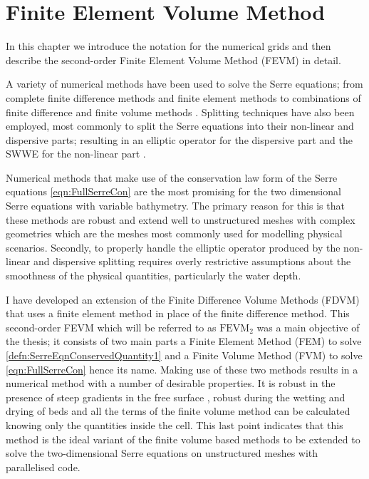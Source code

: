 \chapter{Finite Element Volume Method}
\label{chp:HFVMMethod}
In this chapter we introduce the notation for the numerical grids and then describe the second-order Finite Element Volume Method (FEVM) in detail.

A variety of numerical methods have been used to solve the Serre equations; from complete finite difference methods \cite{Cienfuegos-etal-2006-1217,El-etal-2006} and finite element methods \cite{Mitsotakis-etal-2014,Li-2014-169,Mitsotakis-etal-2017} to combinations of finite difference and finite volume methods \cite{Hank-etal-2010-2034,Zoppou-etal-2017}. Splitting techniques have also been employed, most commonly to split the Serre equations into their non-linear and dispersive parts; resulting in an elliptic operator for the dispersive part and the SWWE for the non-linear part \cite{Bradford-Sanders-2002-953,Dutykh-etal-2013-761,Filippini-etal-2016-381}. 

Numerical methods that make use of the conservation law form of the Serre equations \eqref{eqn:FullSerreCon} \cite{Hank-etal-2010-2034,Li-2014-169,Zoppou-etal-2017} are the most promising for the two dimensional Serre equations with variable bathymetry. The primary reason for this is that these methods are robust and extend well to unstructured meshes with complex geometries which are the meshes most commonly used for modelling physical scenarios. Secondly, to properly handle the elliptic operator produced by the non-linear and dispersive splitting requires overly restrictive assumptions about the smoothness of the physical quantities, particularly the water depth. 

I have developed an extension of the Finite Difference Volume Methods (FDVM) \cite{Hank-etal-2010-2034,Zoppou-etal-2017} that uses a finite element method in place of the finite difference method. This second-order FEVM which will be referred to as $\text{FEVM}_2$ was a main objective of the thesis; it consists of two main parts a Finite Element Method (FEM) to solve \eqref{defn:SerreEqnConservedQuantity1} and a Finite Volume Method (FVM) to solve \eqref{eqn:FullSerreCon} hence its name. Making use of these two methods results in a numerical method with a number of desirable properties. It is robust in the presence of steep gradients in the free surface \cite{Pitt-2018-61}, robust during the wetting and drying of beds and all the terms of the finite volume method can be calculated knowing only the quantities inside the cell. This last point indicates that this method is the ideal variant of the finite volume based methods \cite{Zoppou-etal-2017} to be extended to solve the two-dimensional Serre equations on unstructured meshes with parallelised code.
 
